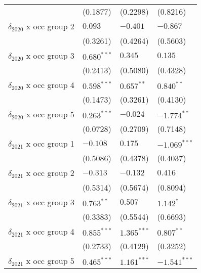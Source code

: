 \begin{tabular}{llll}
                                       &           (0.1877) &           (0.2298) &           (0.8216) \\
$\delta_{2020}$ x occ group 2          &            $0.093$ &           $-0.401$ &           $-0.867$ \\
                                       &           (0.3261) &           (0.4264) &           (0.5603) \\
$\delta_{2020}$ x occ group 3          &      $0.680^{***}$ &            $0.345$ &            $0.135$ \\
                                       &           (0.2413) &           (0.5080) &           (0.4328) \\
$\delta_{2020}$ x occ group 4          &      $0.598^{***}$ &       $0.657^{**}$ &       $0.840^{**}$ \\
                                       &           (0.1473) &           (0.3261) &           (0.4130) \\
$\delta_{2020}$ x occ group 5          &      $0.263^{***}$ &           $-0.024$ &      $-1.774^{**}$ \\
                                       &           (0.0728) &           (0.2709) &           (0.7148) \\
$\delta_{2021}$ x occ group 1          &           $-0.108$ &            $0.175$ &     $-1.069^{***}$ \\
                                       &           (0.5086) &           (0.4378) &           (0.4037) \\
$\delta_{2021}$ x occ group 2          &           $-0.313$ &           $-0.132$ &            $0.416$ \\
                                       &           (0.5314) &           (0.5674) &           (0.8094) \\
$\delta_{2021}$ x occ group 3          &       $0.763^{**}$ &            $0.507$ &          $1.142^*$ \\
                                       &           (0.3383) &           (0.5544) &           (0.6693) \\
$\delta_{2021}$ x occ group 4          &      $0.855^{***}$ &      $1.365^{***}$ &       $0.807^{**}$ \\
                                       &           (0.2733) &           (0.4129) &           (0.3252) \\
$\delta_{2021}$ x occ group 5          &      $0.465^{***}$ &      $1.161^{***}$ &     $-1.541^{***}$ \\

\end{tabular}
